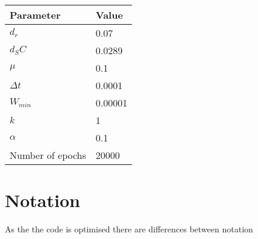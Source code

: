 \documentclass[a4paper,12pt]{article}
\begin{document}
\begin{tabular}{ l l}
\hline
Parameter & Value \\
\hline 
$d_r$ & 0.07 \\
$d_SC$ & 0.0289 \\
$\mu$ & 0.1 \\
$\Delta t$ & 0.0001 \\
$W_{min}$ & 0.00001 \\
$k$ & 1 \\
$\alpha$ & 0.1 \\
Number of epochs & 20000 \\

\hline
\end{tabular}
 
\section{Notation}
As the the code is optimised there are differences between notation 
\end{document}
